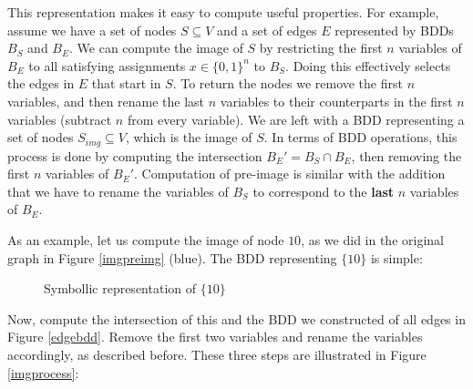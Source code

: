 \documentclass[../master/master.tex]{subfiles}
\begin{document}
This representation makes it easy to compute useful properties. For example, assume we have a set of nodes $S\subseteq V$ and a set of edges $E$ represented by BDDs $B_S$ and $B_E$. We can compute the image of $S$ by restricting the first $n$ variables of $B_E$ to all satisfying assignments $x\in\{0,1\}^{n}$ to $B_S$. Doing this effectively selects the edges in $E$ that start in $S$. To return the nodes we remove the first $n$ variables, and then rename the last $n$ variables to their counterparts in the first $n$ variables (subtract $n$ from every variable). We are left with a BDD representing a set of nodes $S_{img}\subseteq V$, which is the image of $S$. In terms of BDD operations, this process is done by computing the intersection $B_{E}' = B_S\cap B_E$, then removing the first $n$ variables of $B_E'$. Computation of pre-image is similar with the addition that we have to rename the variables of $B_S$ to correspond to the \textbf{last} $n$ variables of $B_E$.

As an example, let us compute the image of node $10$, as we did in the original graph in Figure \ref{imgpreimg} (blue). The BDD representing $\{10\}$ is simple:

\begin{figure}[H]
\center
{}
\caption{Symbollic representation of $\{10\}$}
\end{figure}
Now, compute the intersection of this and the BDD we constructed of all edges in Figure \ref{edgebdd}. Remove the first two variables and rename the variables accordingly, as described before. These three steps are illustrated in Figure  \ref{imgprocess}:
\end{document}
